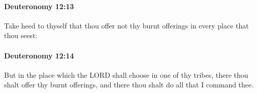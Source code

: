 		\paragraph{Deuteronomy 12:13} %
			\label{DEUTERONOMY-12-13}

			Take heed to thyself that thou offer not thy burnt offerings in every place that thou seest:


		\paragraph{Deuteronomy 12:14} %
			\label{DEUTERONOMY-12-14}

			But in the place which the LORD shall choose in one of thy tribes, there thou shalt offer thy burnt offerings, and there thou shalt do all that I command thee.


